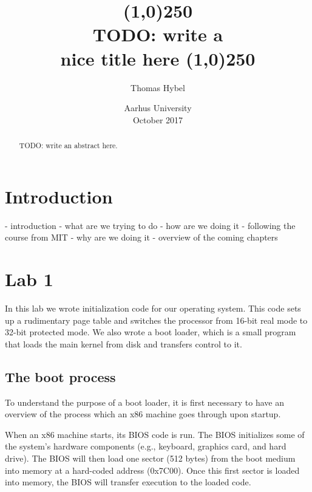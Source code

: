 \documentclass{article}
\title{
\line(1,0){250}\\
\Large \bfseries
TODO: write a \\
nice title here
\line(1,0){250}
}
\author{Thomas Hybel}
\date{Aarhus University \\ October 2017}
\begin{document}
\maketitle

\begin{abstract} 
\noindent 
TODO: write an abstract here.
\end{abstract}
\newpage

\tableofcontents
\newpage
{}




\section*{Introduction}


- introduction
	- what are we trying to do
	- how are we doing it
		- following the course from MIT
	- why are we doing it
	- overview of the coming chapters





\section*{Lab 1}

In this lab we wrote initialization code for our operating system. This code
sets up a rudimentary page table and switches the processor from 16-bit real
mode to 32-bit protected mode. We also wrote a boot loader, which is a small
program that loads the main kernel from disk and transfers control to it.

\subsection*{The boot process}
To understand the purpose of a boot loader, it is first necessary to have an
overview of the process which an x86 machine goes through upon startup.

When an x86 machine starts, its BIOS code is run. The BIOS initializes some of
the system's hardware components (e.g., keyboard, graphics card, and hard
drive). The BIOS will then load one sector (512 bytes) from the boot medium
into memory at a hard-coded address (0x7C00). Once this first sector is loaded
into memory, the BIOS will transfer execution to the loaded code.
\end{document}
